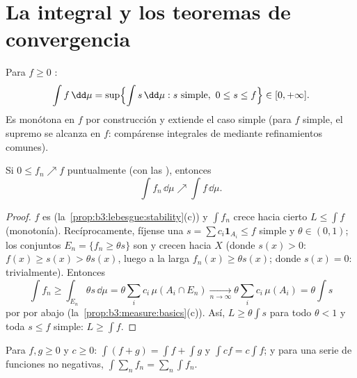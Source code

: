\section{La integral y los teoremas de convergencia}

\begin{definition}\label{def:b3:lebesgue:integral}
Para $f \geq 0$ :
\[
\int f \,\dd\mu = \sup\Bigl\{\int s\,\dd\mu : s \text{ simple},
\ 0 \leq s \leq f\Bigr\} \in [0, +\infty].
\]
Es monótona en $f$ por construcción y extiende el caso simple (para $f$
simple, el supremo se alcanza en $f$: compárense integrales de  mediante refinamientos comunes).
\end{definition}

\begin{theorem}
\label{thm:b3:lebesgue:mct}
Si $0 \leq f_n \nearrow f$ puntualmente (con las
), entonces
\[
\int f_n\,\dd\mu \nearrow \int f\,\dd\mu .
\]
\end{theorem}

\begin{proof}
$f$ es 
(la~\cref{prop:b3:lebesgue:stability}(c)) y $\int f_n$ crece hacia
cierto $L \leq \int f$ (monotonía). Recíprocamente, fíjense una
$s = \sum c_i\mathbf 1_{A_i} \leq f$ simple y $\theta \in (0,1)$; los
conjuntos $E_n = \{f_n \geq \theta s\}$ son
 y crecen hacia $X$ (donde
$s(x) > 0$: $f(x)
\geq s(x) > \theta s(x)$, luego a la larga $f_n(x) \geq \theta
s(x)$; donde $s(x) = 0$: trivialmente). Entonces
\[
\int f_n \geq \int_{E_n}\theta s\,\dd\mu
= \theta\sum_i c_i\,\mu(A_i \cap E_n)
\xrightarrow[n\to\infty]{} \theta\sum_ic_i\,\mu(A_i)
= \theta\int s
\]
por  por abajo
(la~\cref{prop:b3:measure:basics}(c)). Así, $L \geq \theta\int s$ para
todo $\theta < 1$ y toda $s
\leq f$ simple: $L \geq \int f$.
\end{proof}

\begin{corollary}\label{cor:b3:lebesgue:additivity}
Para $f, g \geq 0$  y
$c \geq 0$: $\int(f + g) =
\int f + \int g$ y $\int cf = c\int f$; y para una serie de
funciones  no negativas,
$\int\sum_nf_n =
\sum_n\int f_n$.
\end{corollary}

